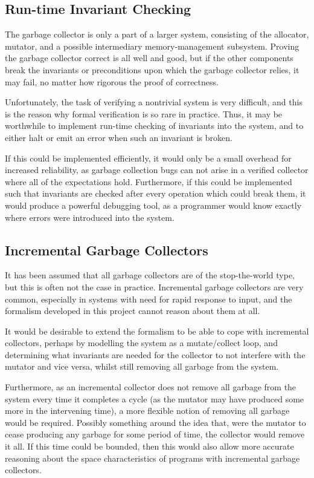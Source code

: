 \subsection{Run-time Invariant Checking}
\label{sec:conclusion-further-invariants}

The garbage collector is only a part of a larger system, consisting of
the allocator, mutator, and a possible intermediary memory-management
subsystem. Proving the garbage collector correct is all well and good,
but if the other components break the invariants or preconditions upon
which the garbage collector relies, it may fail, no matter how
rigorous the proof of correctness.

Unfortunately, the task of verifying a nontrivial system is very
difficult, and this is the reason why formal verification is so rare
in practice. Thus, it may be worthwhile to implement run-time checking
of invariants into the system, and to either halt or emit an error
when such an invariant is broken.

If this could be implemented efficiently, it would only be a small
overhead for increased reliability, as garbage collection bugs can not
arise in a verified collector where all of the expectations
hold. Furthermore, if this could be implemented such that invariants
are checked after every operation which could break them, it would
produce a powerful debugging tool, as a programmer would know exactly
where errors were introduced into the system.

\subsection{Incremental Garbage Collectors}
\label{sec:conclusion-further-incremental}

It has been assumed that all garbage collectors are of the
stop-the-world type, but this is often not the case in
practice. Incremental garbage collectors are very common, especially
in systems with need for rapid response to input, and the formalism
developed in this project cannot reason about them at all.

It would be desirable to extend the formalism to be able to cope with
incremental collectors, perhaps by modelling the system as a
mutate/collect loop, and determining what invariants are needed for
the collector to not interfere with the mutator and vice versa, whilst
still removing all garbage from the system.

Furthermore, as an incremental collector does not remove all garbage
from the system every time it completes a cycle (as the mutator may
have produced some more in the intervening time), a more flexible
notion of removing all garbage would be required. Possibly something
around the idea that, were the mutator to cease producing any garbage
for some period of time, the collector would remove it all. If this
time could be bounded, then this would also allow more accurate
reasoning about the space characteristics of programs with incremental
garbage collectors.

